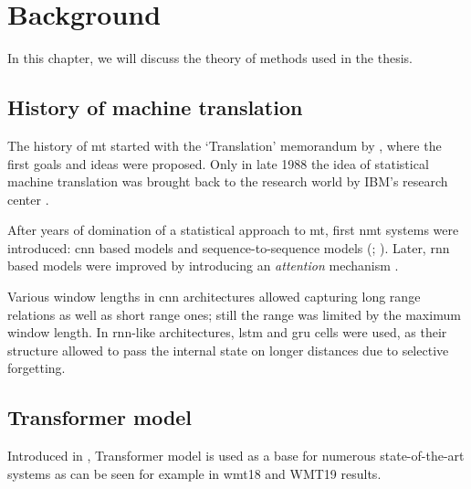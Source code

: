 \chapter{{Background}}

In this chapter, we will discuss the theory of methods used in the thesis.

\section{{History of machine translation}}

The history of \acrfull{mt} started with the `Translation' memorandum
by \citet{Weaver1955}, where the first goals and ideas were proposed.
Only in late 1988 the idea of statistical machine translation was 
brought back to the research world by IBM's research center .

After years of domination of a statistical approach to \acrshort{mt},
first \acrfull{nmt} systems were introduced:
\acrfull{cnn} based models \citep{kalchbrenner-blunsom-2013-recurrent} and
sequence-to-sequence models (; ).
Later, \acrfull{rnn} based models were improved by introducing an
\emph{attention} mechanism \citep{Bahdanau2014-attention}.

Various window lengths in \acrshort{cnn} architectures allowed capturing
long range relations as well as short range ones;
still the range was limited by the maximum window length.
In \acrshort{rnn}-like architectures, \acrfull{lstm} and \acrfull{gru} cells
were used, as their structure allowed to pass the internal state
on longer distances due to selective forgetting.

\section{{Transformer model}}
\label{section:transformer}

Introduced in , Transformer model is used as a base
for numerous state-of-the-art systems as can be seen for example in 
\acrshort{wmt}18  and
WMT19  results.

